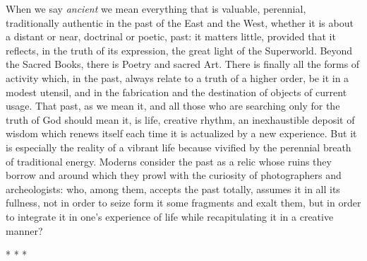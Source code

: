 When we say \emph{ancient} we mean everything that is valuable, perennial, traditionally authentic in the past of the East and the West, whether it is about a distant or near, doctrinal or poetic, past: it matters little, provided that it reflects, in the truth of its expression, the great light of the Superworld. Beyond the Sacred Books, there is Poetry and sacred Art. There is finally all the forms of activity which, in the past, always relate to a truth of a higher order, be it in a modest utensil, and in the fabrication and the destination of objects of current usage. That past, as we mean it, and all those who are searching only for the truth of God should mean it, is life, creative rhythm, an inexhaustible deposit of wisdom which renews itself each time it is actualized by a new experience. But it is especially the reality of a vibrant life because vivified by the perennial breath of traditional energy. Moderns consider the past as a relic whose ruins they borrow and around which they prowl with the curiosity of photographers and archeologists: who, among them, accepts the past totally, assumes it in all its fullness, not in order to seize form it some fragments and exalt them, but in order to integrate it in one's experience of life while recapitulating it in a creative manner?



\begin{center}* * *\end{center}

